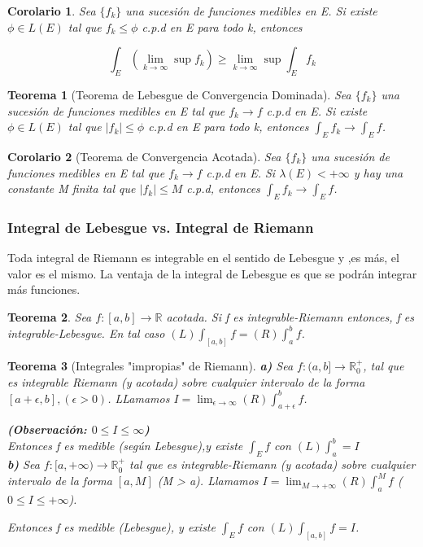 \documentclass{article}
\newtheorem{theorem}{Teorema}
\newtheorem{corollary}{Corolario}
\begin{document}
\begin{corollary}
Sea $\{f_k\}$ una sucesión de funciones medibles en E. Si existe $\phi \in L(E)$ tal que $f_k \leq \phi$ c.p.d en E para todo k, entonces

\begin{equation*}
\int_E (\lim_{k \to \infty} \sup f_k) \geq \lim_{k \to \infty} \sup \int_E f_k
\end{equation*}
\end{corollary}

\begin{theorem}[Teorema de Lebesgue de Convergencia Dominada]
Sea $\{f_k\}$ una sucesión de funciones medibles en E tal que $f_k \rightarrow f$ c.p.d en E. Si existe $\phi \in L(E)$ tal que $|f_k| \leq \phi$ c.p.d en E para todo k, entonces $\int_E f_k \rightarrow \int_E f$.
\end{theorem}

\begin{corollary}[Teorema de Convergencia Acotada]
Sea $\{f_k\}$ una sucesión de funciones medibles en E tal que $f_k \rightarrow f$ c.p.d en E. Si $\lambda(E) < +\infty$ y hay una constante M finita tal que $|f_k| \leq M$ c.p.d, entonces $\int_E f_k \rightarrow \int_E f$.
\end{corollary}

\subsubsection{Integral de Lebesgue vs. Integral de Riemann}
Toda integral de Riemann es integrable en el sentido de Lebesgue y ,es más, el valor es el mismo. La ventaja de la integral de Lebesgue es que se podrán integrar más funciones.

\begin{theorem}
Sea $f: [a,b] \rightarrow \mathbb{R}$ acotada. Si f es integrable-Riemann entonces, f es integrable-Lebesgue. En tal caso $(L)\int_{[a,b]}f=(R)\int_a^b f$.
\end{theorem}

\begin{theorem}[Integrales "impropias" de Riemann]
\textbf{a)} Sea $f: (a,b] \rightarrow \mathbb{R}_0^+$, tal que es integrable Riemann (y acotada) sobre cualquier intervalo de la forma $[a+\epsilon, b], (\epsilon > 0)$. LLamamos $I=\lim_{\epsilon \to \infty} (R)\int_{a+\epsilon}^b f$. 

\textbf{(Observación: $0\leq I \leq \infty$)} \\

Entonces f es medible (según Lebesgue),y existe $\int_E f$ con $(L)\int_a^b = I$ \\

\textbf{b)} Sea $f: [a,+\infty) \rightarrow \mathbb{R}_0^+$ tal que es integrable-Riemann (y acotada) sobre cualquier intervalo de la forma $[a,M]$ (M > a). Llamamos $I=\lim_{M \to +\infty} (R)\int_a^M f$ ($0 \leq I \leq +\infty$).

Entonces f es medible (Lebesgue), y existe $\int_E f$ con $(L)\int_{[a,b]} f = I$.
\end{theorem}
\end{document}
